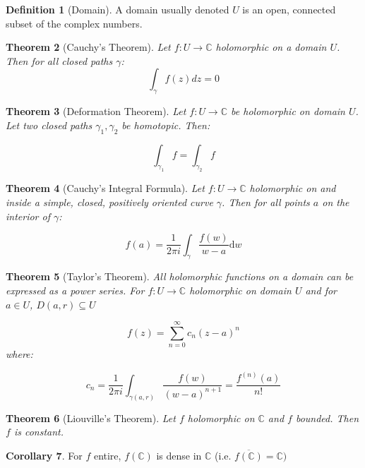 \documentclass[11pt,a4paper, titlepage]{article}
\newtheorem{theorem}{Theorem}[section]
\theoremstyle{definition}
\newtheorem{definition}[theorem]{Definition}
\newtheorem{corollary}[theorem]{Corollary}
\begin{document}
\begin{definition}[Domain]
A domain usually denoted $U$ is an open, connected subset of the complex numbers.
\end{definition}

\begin{theorem}[Cauchy's Theorem]

Let $ f \colon U \longrightarrow \mathbb{C}$ holomorphic on a domain $U$. Then for all closed paths $\gamma$:
\[
	\int_\gamma f(z) dz = 0
\]

\end{theorem}

\begin{theorem}[Deformation Theorem]

Let $f \colon U \longrightarrow \mathbb{C}$ be holomorphic on domain $U$. Let two closed paths $\gamma_1, \gamma_2 $ be homotopic. Then:

\[
	\int_{\gamma_1} f = \int_{\gamma_2} f
\]	

\end{theorem}

\begin{theorem}[Cauchy's Integral Formula]

Let $f \colon U \longrightarrow \mathbb{C}$ holomorphic on and inside a simple, closed, positively oriented curve $\gamma$. Then for all points $a$ on the interior of $\gamma$:

\[
	f(a) = \frac{1}{2\pi i} \int_\gamma \frac{f(w)}{w-a} \mathrm{d}w
\]	

\end{theorem}

\begin{theorem}[Taylor's Theorem]

All holomorphic functions on a domain can be expressed as a power series. For $f \colon U \longrightarrow \mathbb{C}$ holomorphic on domain $U$ and for $a \in U$, $D(a,r) \subseteq U$

\[
	f(z) = 	\sum_{n=0}^\infty c_n (z-a)^n
\]
where:

\[
	c_n = \frac{1}{2 \pi i} \int_{\gamma(a,r)} \frac{f(w)}{(w-a)^{n+1}} = \frac{f^{(n)}(a)}{n!}
\]
\end{theorem}


\begin{theorem}[Liouville's Theorem]
Let $f$ holomorphic on $\mathbb{C}$ and $f$ bounded. Then $f$ is constant.
\end{theorem}

\begin{corollary}
For $f$ entire, $f(\mathbb{C})$ is dense in $\mathbb{C}$ (i.e. $\overline {f(\mathbb{C})} = \mathbb{C})$
\end{corollary}
\end{document}
